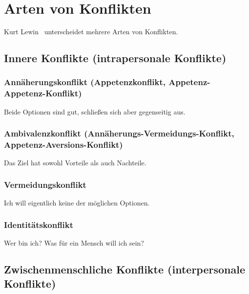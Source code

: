 \section{Arten von Konflikten}
\label{konflikt-arten}

Kurt Lewin~\cite{gelingende-kommunikation-revisited, schneider-konflikte} unterscheidet mehrere Arten von Konflikten.


\subsection{Innere Konflikte (intrapersonale Konflikte)}


\subsubsection{Annäherungskonflikt (Appetenzkonflikt, Appetenz-Appetenz-Konflikt)}

Beide Optionen sind gut, schließen sich aber gegenseitig aus.

\subsubsection{Ambivalenzkonflikt (Annäherungs-Vermeidungs-Konflikt, Appetenz-Aversions-Konflikt)}

Das Ziel hat sowohl Vorteile als auch Nachteile.


\subsubsection{Vermeidungskonflikt}

Ich will eigentlich keine der möglichen Optionen.


\subsubsection{Identitätskonflikt}

Wer bin ich? Was für ein Mensch will ich sein?


\subsection{Zwischenmenschliche Konflikte (interpersonale Konflikte)}

